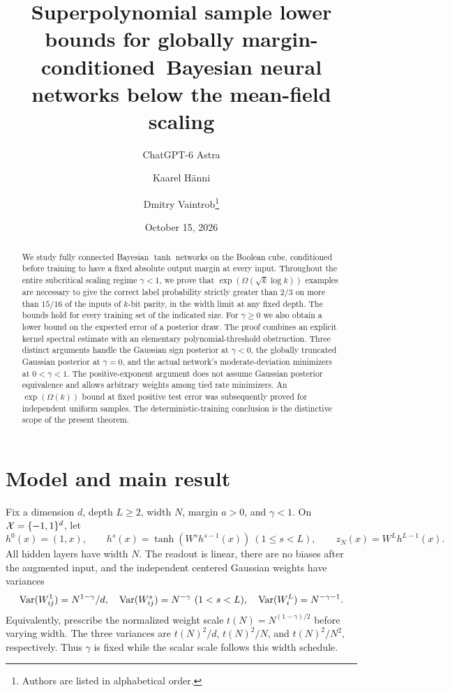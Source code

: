 \documentclass[11pt]{article}
\title{Superpolynomial sample lower bounds for globally margin-conditioned\ Bayesian neural networks below the mean-field scaling}
\author{ChatGPT-6 Astra \and Kaarel H\"anni \and Dmitry Vaintrob\thanks{Authors are listed in alphabetical order.}}
\date{October 15, 2026}
\theoremstyle{remark}\newtheorem{remark}[theorem]{Remark}
\begin{document}
\maketitle
\begin{abstract}
We study fully connected Bayesian $\tanh$ networks on the Boolean cube,
conditioned before training to have a fixed absolute output margin at
every input. Throughout the entire subcritical scaling regime
$\gamma<1$, we prove that $\exp(\Omega(\sqrt{k}\log k))$ examples
are necessary to give the correct label probability strictly greater
than $2/3$ on more than $15/16$ of the inputs of $k$-bit parity, in
the width limit at any fixed depth. The bounds hold for every training
set of the indicated size. For $\gamma\ge0$ we also obtain a lower
bound on the expected error of a posterior draw. The proof combines
an explicit kernel spectral estimate with an elementary
polynomial-threshold obstruction. Three distinct arguments handle
the Gaussian sign posterior at $\gamma<0$, the globally truncated
Gaussian posterior at $\gamma=0$, and the actual network's
moderate-deviation minimizers at $0<\gamma<1$. The positive-exponent
argument does not assume Gaussian posterior equivalence and allows
arbitrary weights among tied rate minimizers. An $\exp(\Omega(k))$
bound at fixed positive test error was subsequently proved for independent
uniform samples. The deterministic-training conclusion is the distinctive
scope of the present theorem.
\end{abstract}

\section{Model and main result}
Fix a dimension $d$, depth $L\ge2$, width $N$, margin $a>0$, and
$\gamma<1$. On $\mathcal X=\{-1,1\}^d$, let
\[
 h^0(x)=(1,x),\qquad h^s(x)=\tanh(W^s h^{s-1}(x))\ (1\le s<L),
 \qquad z_N(x)=W^L h^{L-1}(x).
\]
All hidden layers have width $N$. The readout is linear, there are no
biases after the augmented input, and the independent centered Gaussian
weights have variances
\begin{equation}\label{eq:weights}
 \operatorname{Var}(W^1_{ij})=N^{1-\gamma}/d,\quad
 \operatorname{Var}(W^s_{ij})=N^{-\gamma}\ (1<s<L),\quad
 \operatorname{Var}(W^L_i)=N^{-\gamma-1}.
\end{equation}
Equivalently, prescribe the normalized weight scale
$t(N)=N^{(1-\gamma)/2}$ before varying width. The three variances are
$t(N)^2/d$, $t(N)^2/N$, and $t(N)^2/N^2$, respectively.
Thus $\gamma$ is fixed while the scalar scale follows this width schedule.
\end{document}
